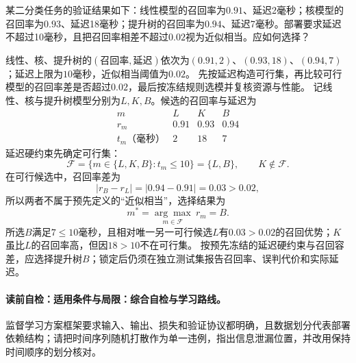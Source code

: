 \label{struct:V3-C07-CH18}
\label{struct:V3-C07-CH32}
\begin{example}[代价与资源共同约束下的方法选择]\label{exm:V3-C07-selection}
某二分类任务的验证结果如下：线性模型的召回率为$0.91$、延迟2毫秒；核模型的召回率为$0.93$、延迟18毫秒；提升树的召回率为$0.94$、延迟7毫秒。部署要求延迟不超过10毫秒，且把召回率相差不超过$0.02$视为近似相当。应如何选择？

\label{struct:V3-C07-CH33}
\end{example}
{\let\needspace\Needspace\setlength{\smallskipamount}{3pt}}
\begin{solution}
\SolGiven 线性、核、提升树的$(\text{召回率},\text{延迟})$依次为$(0.91,2)$、$(0.93,18)$、$(0.94,7)$；延迟上限为$10$毫秒，近似相当阈值为$0.02$。
\SolPlan 先按延迟构造可行集，再比较可行模型的召回率差是否超过$0.02$，最后按冻结规则选模并复核资源与性能。
\SolDerive
记线性、核与提升树模型分别为$L,K,B$。候选的召回率与延迟为
\[
\begin{array}{c|ccc}
m&L&K&B\\ \hline
r_m&0.91&0.93&0.94\\
t_m\text{（毫秒）}&2&18&7
\end{array}
\]
延迟硬约束先确定可行集：
\[
\mathcal F
=\{m\in\{L,K,B\}:t_m\leq 10\}
=\{L,B\},
\qquad K\notin\mathcal F.
\]
在可行候选中，召回率差为
\[
|r_B-r_L|=|0.94-0.91|=0.03>0.02,
\]
所以两者不属于预先定义的“近似相当”，选择结果为
\[
m^*=\underset{m\in\mathcal F}{\arg\max}\ r_m=B.
\]
\SolCheck 所选$B$满足$7\le10$毫秒，且相对唯一另一可行候选$L$有$0.03>0.02$的召回优势；$K$虽比$L$的召回率高，但因$18>10$不在可行集。
\SolAnswer 按预先冻结的延迟硬约束与召回容差，应选择提升树$B$；锁定后仍须在独立测试集报告召回率、误判代价和实际延迟。
\end{solution}

\label{struct:V3-C07-CH28}
\paragraph{读前自检：适用条件与局限：综合自检与学习路线。}监督学习方案框架要求输入、输出、损失和验证协议都明确，且数据划分代表部署依赖结构；请把时间序列随机打散作为单一违例，指出信息泄漏位置，并改用保持时间顺序的划分核对。\par

